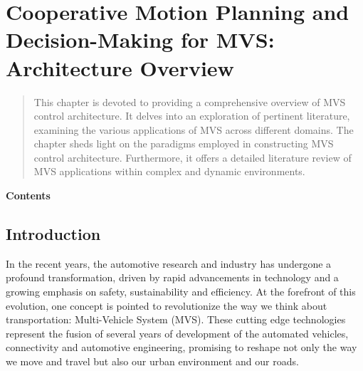 \chapter{Cooperative Motion Planning and Decision-Making for MVS: Architecture Overview} \label{sec: CooperativeNavigation_GlobalOverview} \label{chap:chapter2}




\begin{abstract}
This chapter is devoted to providing a comprehensive overview of MVS control architecture. It delves into an exploration of pertinent literature, examining the various applications of MVS across different domains. The chapter sheds light on the paradigms employed in constructing MVS control architecture. Furthermore, it offers a detailed literature review of MVS applications within complex and dynamic environments.
    
\end{abstract}


\textbf{Contents}
\vspace{0.15cm}
\hline
\hspace{2cm}
\localtableofcontents
\hspace{2cm}
\hline











\section{Introduction}


In the recent years, the automotive research and industry has undergone a profound transformation, driven by rapid advancements in technology and a growing emphasis on safety, sustainability and efficiency. At the forefront of this evolution, one concept is pointed to revolutionize the way we think about transportation: Multi-Vehicle System (MVS). These cutting edge technologies represent the fusion of several years of development of the automated vehicles, connectivity and automotive engineering, promising to reshape not only the way we move and travel but also our urban environment and our roads. 




